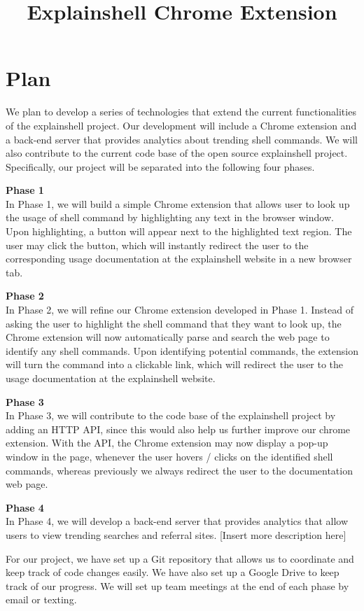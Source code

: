 \documentclass[11pt]{article}
\title{Explainshell Chrome Extension \\ \vspace*{.5em} \Large\mytitle}
\date{}
\newcommand{\myname}{Your name here}
\begin{document}
\clearpage\maketitle
\thispagestyle{firststyle}
\newpage
{}  
\lhead{\myname}
\rhead{\thepage}
\setlength{\voffset}{-50pt}
\setlength{\headsep}{25pt}

\section{Plan}

We plan to develop a series of technologies that extend the current functionalities of the explainshell project. Our development will include a Chrome extension and a back-end server that provides analytics about trending shell commands. We will also contribute to the current code base of the open source explainshell project. Specifically, our project will be separated into the following four phases. 

\par{\bf Phase 1}\\ 
In Phase 1, we will build a simple Chrome extension that allows user to look up the usage of shell command by highlighting any text in the browser window. Upon highlighting, a button will appear next to the highlighted text region. The user may click the button, which will instantly redirect the user to the corresponding usage documentation at the explainshell website in a new browser tab.

\par{\bf Phase 2}\\
In Phase 2, we will refine our Chrome extension developed in Phase 1. Instead of asking the user to highlight the shell command that they want to look up, the Chrome extension will now automatically parse and search the web page to identify any shell commands. Upon identifying potential commands, the extension will turn the command into a clickable link, which will redirect the user to the usage documentation at the explainshell website.

\par{\bf Phase 3}\\
In Phase 3, we will contribute to the code base of the explainshell project by adding an HTTP API, since this would also help us further improve our chrome extension. With the API, the Chrome extension may now display a pop-up window in the page, whenever the user hovers / clicks on the identified shell commands, whereas previously we always redirect the user to the documentation web page.

\par{\bf Phase 4}\\
In Phase 4, we will develop a back-end server that provides analytics that allow users to view trending searches and referral sites. [Insert more description here]

For our project, we have set up a Git repository that allows us to coordinate and keep track of code changes easily. We have also set up a Google Drive to keep track of our progress. We will set up team meetings at the end of each phase by email or texting.
\end{document}
